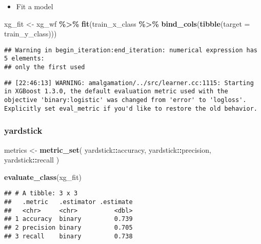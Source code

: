 \documentclass[
]{book}
\newenvironment{Shaded}{\begin{snugshade}}{\end{snugshade}}
\newcommand{\DataTypeTok}[1]{\textcolor[rgb]{0.13,0.29,0.53}{#1}}
\newcommand{\KeywordTok}[1]{\textcolor[rgb]{0.13,0.29,0.53}{\textbf{#1}}}
\newcommand{\NormalTok}[1]{#1}
\newcommand{\OperatorTok}[1]{\textcolor[rgb]{0.81,0.36,0.00}{\textbf{#1}}}
\newcommand{\StringTok}[1]{\textcolor[rgb]{0.31,0.60,0.02}{#1}}
\providecommand{\tightlist}{%
  \setlength{\itemsep}{0pt}\setlength{\parskip}{0pt}}
\begin{document}
\begin{itemize}
\tightlist
\item
  Fit a model
\end{itemize}

\begin{Shaded}
\begin{Highlighting}[]
\NormalTok{xg\_fit \textless{}{-}}\StringTok{ }\NormalTok{xg\_wf }\OperatorTok{\%\textgreater{}\%}\StringTok{ }\KeywordTok{fit}\NormalTok{(train\_x\_class }\OperatorTok{\%\textgreater{}\%}\StringTok{ }\KeywordTok{bind\_cols}\NormalTok{(}\KeywordTok{tibble}\NormalTok{(}\DataTypeTok{target =}\NormalTok{ train\_y\_class)))}
\end{Highlighting}
\end{Shaded}

\begin{verbatim}
## Warning in begin_iteration:end_iteration: numerical expression has 5 elements:
## only the first used
\end{verbatim}

\begin{verbatim}
## [22:46:13] WARNING: amalgamation/../src/learner.cc:1115: Starting in XGBoost 1.3.0, the default evaluation metric used with the objective 'binary:logistic' was changed from 'error' to 'logloss'. Explicitly set eval_metric if you'd like to restore the old behavior.
\end{verbatim}

\hypertarget{yardstick-3}{%
\subsubsection{yardstick}\label{yardstick-3}}

\begin{Shaded}
\begin{Highlighting}[]
\NormalTok{metrics \textless{}{-}}\StringTok{ }\KeywordTok{metric\_set}\NormalTok{(}
\NormalTok{  yardstick}\OperatorTok{::}\NormalTok{accuracy,}
\NormalTok{  yardstick}\OperatorTok{::}\NormalTok{precision,}
\NormalTok{  yardstick}\OperatorTok{::}\NormalTok{recall}
\NormalTok{)}

\KeywordTok{evaluate\_class}\NormalTok{(xg\_fit)}
\end{Highlighting}
\end{Shaded}

\begin{verbatim}
## # A tibble: 3 x 3
##   .metric   .estimator .estimate
##   <chr>     <chr>          <dbl>
## 1 accuracy  binary         0.739
## 2 precision binary         0.705
## 3 recall    binary         0.738
\end{verbatim}
\end{document}
